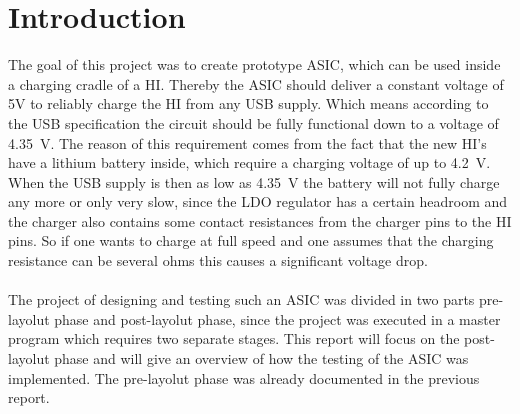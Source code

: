 \section{Introduction}
\label{chap:introduction}
The goal of this project was to create prototype \ac{ASIC}, which can be used inside a charging cradle of a \ac{HI}. Thereby the \ac{ASIC} should deliver a constant voltage of 5V to reliably charge the \ac{HI} from any \ac{USB} supply. Which means according to the \ac{USB} specification the circuit should be fully functional down to a voltage of \qty{4.35}{\volt}. The reason of this requirement comes from the fact that the new \ac{HI}'s have a lithium battery inside, which require a charging voltage of up to \qty{4.2}{\volt}. When the \ac{USB} supply is then as low as \qty{4.35}{\volt} the battery will not fully charge any more or only very slow, since the \ac{LDO} regulator has a certain headroom and the charger also contains some contact resistances from the charger pins to the \ac{HI} pins. So if one wants to charge at full speed and one assumes that the charging resistance can be several ohms this causes a significant voltage drop. \cite{analog_devices_usb_charging} \\\\
The project of designing and testing such an \ac{ASIC} was divided in two parts \glqq pre-layolut phase\grqq{} and \glqq post-layolut phase\grqq{}, since the project was executed in a master program which requires two separate stages. This report will focus on the \glqq post-layolut phase\grqq{} and will give an overview of how the testing of the \ac{ASIC} was implemented. The \glqq pre-layolut phase\grqq{} was already documented in the previous report. \\\\
\clearpage